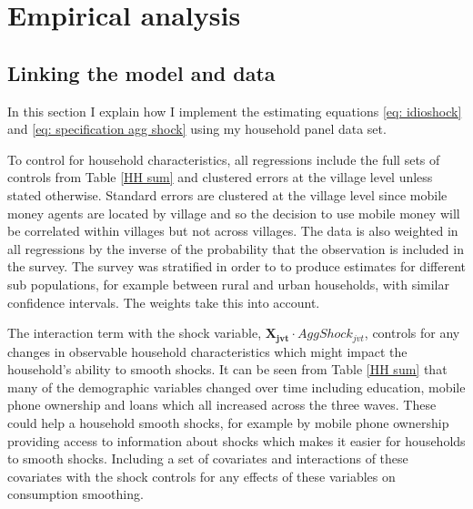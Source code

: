\newpage
\section{Empirical analysis}
\subsection{Linking the model and data}
In this section I explain how I implement the estimating equations \eqref{eq: idioshock} and \eqref{eq: specification agg shock} using my household panel data set. 

To control for household characteristics, all regressions include the full sets of controls from Table \ref{HH sum} and clustered errors at the village level unless stated otherwise. Standard errors are clustered at the village level since mobile money agents are located by village and so the decision to use mobile money will be correlated within villages but not across villages. The data is also weighted in all regressions by the inverse of the probability that the observation is included in the survey. The survey was stratified in order to to produce estimates for different sub populations, for example between rural and urban households, with similar confidence intervals. The weights take this into account.

The interaction term with the shock variable, $\bm{X_{jvt}} \cdot AggShock_{jvt}$, controls for any changes in observable household characteristics which might impact the household's ability to smooth shocks. It can be seen from Table \ref{HH sum} that many of the demographic variables changed over time including education, mobile phone ownership and loans which all increased across the three waves. These could help a household smooth shocks, for example by mobile phone ownership providing access to information about shocks which makes it easier for households to smooth shocks. Including a set of covariates and interactions of these covariates with the shock controls for any effects of these variables on consumption smoothing.  

